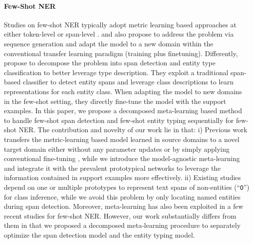 \documentclass[11pt]{article}
\begin{document}
\paragraph{Few-Shot NER}
Studies on few-shot NER typically adopt metric learning based approaches at either token-level \citep{fritzler2019few, hou2020few, yang2020simple, tong2021fewother} or span-level \citep{yu2021fewShot, wang2021enhanced}. \citet{athiwaratkun2020augmented} and \citet{cui2021template} also propose to address the problem via sequence generation and adapt the model to a new domain within the conventional transfer learning paradigm (training plus finetuning).
Differently, \citet{wang2021learning} propose to decompose the problem into span detection and entity type classification to better leverage type description.
They exploit a traditional span-based classifier to detect entity spans and leverage class descriptions to learn representations for each entity class. 
When adapting the model to new domains in the few-shot setting, they directly fine-tune the model with the support examples. 
In this paper, we propose a decomposed meta-learning based method to handle few-shot span detection and few-shot entity typing sequentially for few-shot NER.
The contribution and novelty of our work lie in that:
i) Previous work transfers the metric-learning based model learned in source domains to a novel target domain either without any parameter updates \citep{hou2020few, wang2021enhanced} or by simply applying conventional fine-tuning \citep{cui2021template, das2021container, wang2021learning}, 
while we introduce the model-agnostic meta-learning and integrate it with the prevalent prototypical networks to leverage the information contained in support examples more effectively. 
ii) Existing studies depend on one \citep{hou2020few} or multiple prototypes \citep{tong2021fewother, wang2021enhanced} to represent text spans of non-entities (``\texttt{O}'') for class inference,
while we avoid this problem by only locating named entities during span detection.
Moreover, meta-learning has also been exploited in a few recent studies \citep{li2020metaner,lichy2021meta} for few-shot NER.
However, our work substantially differs from them in that we proposed a decomposed meta-learning procedure to separately optimize the span detection model and the entity typing model.
\end{document}
